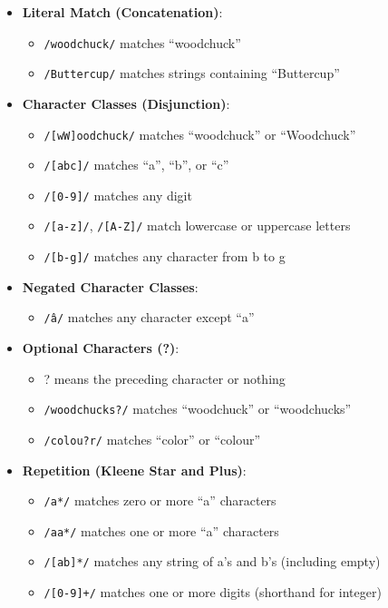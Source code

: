 \documentclass{article}
\begin{document}
\begin{itemize}
    \item \textbf{Literal Match (Concatenation)}:
          \begin{itemize}
              \item \texttt{/woodchuck/} matches “woodchuck”
              \item \texttt{/Buttercup/} matches strings containing “Buttercup”
          \end{itemize}

    \item \textbf{Character Classes (Disjunction)}:
          \begin{itemize}
              \item \texttt{/[wW]oodchuck/} matches “woodchuck” or “Woodchuck”
              \item \texttt{/[abc]/} matches “a”, “b”, or “c”
              \item \texttt{/[0-9]/} matches any digit
              \item \texttt{/[a-z]/}, \texttt{/[A-Z]/} match lowercase or uppercase letters
              \item \texttt{/[b-g]/} matches any character from b to g
          \end{itemize}

    \item \textbf{Negated Character Classes}:
          \begin{itemize}
              \item \texttt{/\^a/} matches any character except “a”
          \end{itemize}

    \item \textbf{Optional Characters (?)}:
          \begin{itemize}
              \item ? means the preceding character or nothing
              \item \texttt{/woodchucks?/} matches “woodchuck” or “woodchucks”
              \item \texttt{/colou?r/} matches “color” or “colour”
          \end{itemize}

    \item \textbf{Repetition (Kleene Star and Plus)}:
          \begin{itemize}
              \item \texttt{/a*/} matches zero or more “a” characters
              \item \texttt{/aa*/} matches one or more “a” characters
              \item \texttt{/[ab]*/} matches any string of a’s and b’s (including empty)
              \item \texttt{/[0-9]+/} matches one or more digits (shorthand for integer)
          \end{itemize}


\end{itemize}
\end{document}

